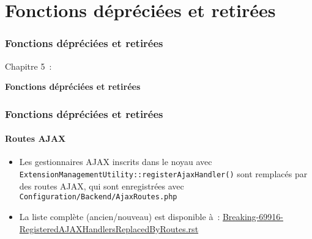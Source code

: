 %

\section{Fonctions dépréciées et retirées}
\begin{frame}[fragile]
	\frametitle{Fonctions dépréciées et retirées}

	\begin{center}\huge{Chapitre 5~:}\end{center}
	\begin{center}\huge{\color{typo3darkgrey}\textbf{Fonctions dépréciées et retirées}}\end{center}

\end{frame}


\begin{frame}[fragile]
	\frametitle{Fonctions dépréciées et retirées}
	\framesubtitle{Routes AJAX}

	\begin{itemize}

		\item Les gestionnaires AJAX inscrits dans le noyau avec
			\texttt{ExtensionManagementUtility::registerAjaxHandler()}
			sont remplacés par des routes AJAX, qui sont enregistrées avec
			\texttt{Configuration/Backend/AjaxRoutes.php}

		\item La liste complète (ancien/nouveau) est disponible à~:\newline
				\href{https://forge.typo3.org/projects/typo3cms-core/repository/revisions/3f0fb6229ba391356e5ed4984eb1c9418ba6663e/entry/typo3/sysext/core/Documentation/Changelog/master/Breaking-69916-RegisteredAJAXHandlersReplacedByRoutes.rst}{Breaking-69916-RegisteredAJAXHandlersReplacedByRoutes.rst}
	\end{itemize}

\end{frame}


